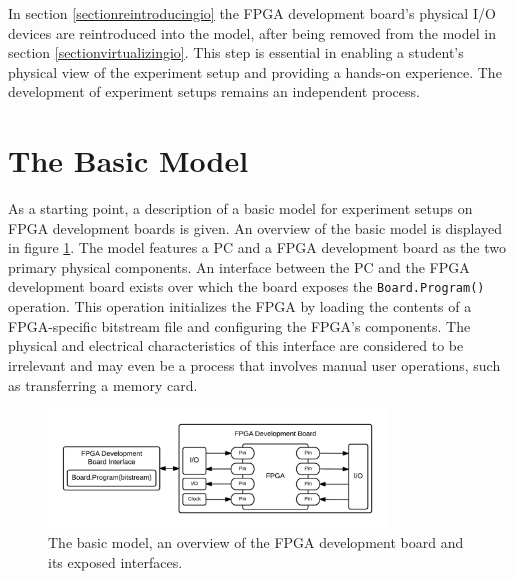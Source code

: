 \documentclass[openright]{template/uva-bachelor-thesis}
\begin{document}
In section \ref{sectionreintroducingio} the FPGA development board's physical I/O devices are reintroduced into the model, after being removed from the model in section \ref{sectionvirtualizingio}. This step is essential in enabling a student's physical view of the experiment setup and providing a hands-on experience. The development of experiment setups remains an independent process.



\section{The Basic Model}
\label{sectionbasicmodel}



As a starting point, a description of a basic model for experiment setups on FPGA development boards is given. An overview of the basic model is displayed in figure \ref{fig:overview-basic}. The model features a PC and a FPGA development board as the two primary physical components. An interface between the PC and the FPGA development board exists over which the board exposes the \texttt{Board.Program()} operation. This operation initializes the FPGA by loading the contents of a FPGA-specific bitstream file and configuring the FPGA's components. The physical and electrical characteristics of this interface are considered to be irrelevant and may even be a process that involves manual user operations, such as transferring a memory card.


\begin{figure}[h]
\centering
\includegraphics[width=0.8\textwidth]{img/overview-basic}
\caption{The basic model, an overview of the FPGA development board and its exposed interfaces.}
\label{fig:overview-basic}
\end{figure}
\end{document}
